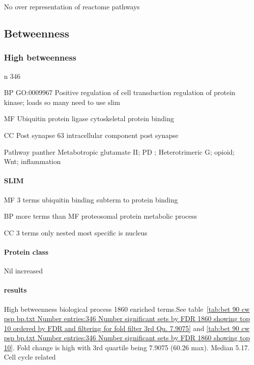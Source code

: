 No over representation of reactome pathways
\clearpage
 \subsection{Betweenness}
 \subsubsection{High betweenness}
 n 346
 
BP GO:0009967 Positive regulation of cell transduction
regulation of protein kinase; loads so many need to use slim

MF Ubiquitin protein ligase
cytoskeletal protein binding

CC Post synapse 63 intracellular component post synapse

Pathway panther 
Metabotropic glutamate II; PD ; Heterotrimeric G; opioid; Wnt; inflammation

\paragraph{SLIM}
MF 3 terms ubiquitin binding subterm to protein binding

BP more terms than MF proteosomal protein metabolic process

CC 3 terms only nested most specific is nucleus

\paragraph{Protein class} Nil increased


\paragraph{results}

High betweenness biological process 1860 enriched terms.See table~\ref{tab:bet 90 cw psp bp.txt Number entries:346 Number significant sets by FDR 1860 showing top 10 ordered by FDR and filtering for fold filter 3rd Qu. 7.9075} and  
\ref{tab:bet 90 cw psp bp.txt Number entries:346 Number significant sets by FDR 1860 showing top 10}. Fold change is high with 3rd quartile  being 7.9075 (60.26 max). Median 5.17. Cell cycle related


